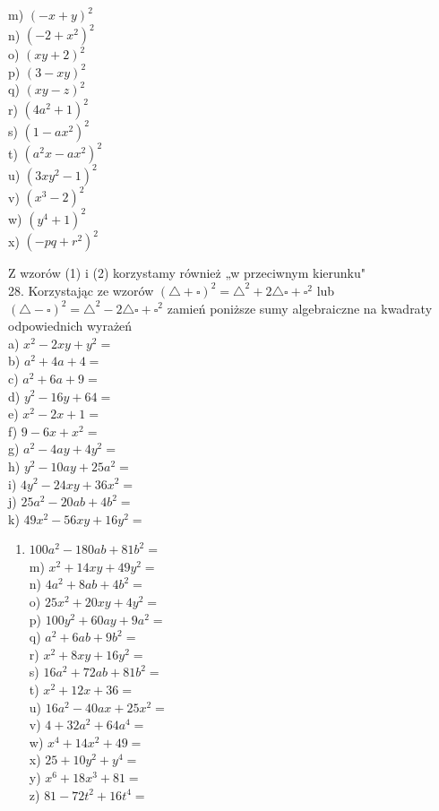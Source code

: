 \documentclass[10pt]{article}
\begin{document}
\begin{enumerate}
m) \((-x+y)^{2}\)\\
n) \(\left(-2+x^{2}\right)^{2}\)\\
o) \((x y+2)^{2}\)\\
p) \((3-x y)^{2}\)\\
q) \((x y-z)^{2}\)\\
r) \(\left(4 a^{2}+1\right)^{2}\)\\
s) \(\left(1-a x^{2}\right)^{2}\)\\
t) \(\left(a^{2} x-a x^{2}\right)^{2}\)\\
u) \(\left(3 x y^{2}-1\right)^{2}\)\\
v) \(\left(x^{3}-2\right)^{2}\)\\
w) \(\left(y^{4}+1\right)^{2}\)\\
x) \(\left(-p q+r^{2}\right)^{2}\)
\end{enumerate}

Z wzorów (1) i (2) korzystamy również „w przeciwnym kierunku"\\
28. Korzystając ze wzorów \((\triangle+\square)^{2}=\triangle^{2}+2 \triangle \square+\square^{2}\) lub \((\triangle-\square)^{2}=\triangle^{2}-2 \triangle \square+\square^{2}\) zamień poniższe sumy algebraiczne na kwadraty odpowiednich wyrażeń\\
a) \(x^{2}-2 x y+y^{2}=\)\\
b) \(a^{2}+4 a+4=\)\\
c) \(a^{2}+6 a+9=\)\\
d) \(y^{2}-16 y+64=\)\\
e) \(x^{2}-2 x+1=\)\\
f) \(9-6 x+x^{2}=\)\\
g) \(a^{2}-4 a y+4 y^{2}=\)\\
h) \(y^{2}-10 a y+25 a^{2}=\)\\
i) \(4 y^{2}-24 x y+36 x^{2}=\)\\
j) \(25 a^{2}-20 a b+4 b^{2}=\)\\
k) \(49 x^{2}-56 x y+16 y^{2}=\)

\begin{enumerate}
  \item \(100 a^{2}-180 a b+81 b^{2}=\)\\
m) \(x^{2}+14 x y+49 y^{2}=\)\\
n) \(4 a^{2}+8 a b+4 b^{2}=\)\\
o) \(25 x^{2}+20 x y+4 y^{2}=\)\\
p) \(100 y^{2}+60 a y+9 a^{2}=\)\\
q) \(a^{2}+6 a b+9 b^{2}=\)\\
r) \(x^{2}+8 x y+16 y^{2}=\)\\
s) \(16 a^{2}+72 a b+81 b^{2}=\)\\
t) \(x^{2}+12 x+36=\)\\
u) \(16 a^{2}-40 a x+25 x^{2}=\)\\
v) \(4+32 a^{2}+64 a^{4}=\)\\
w) \(x^{4}+14 x^{2}+49=\)\\
x) \(25+10 y^{2}+y^{4}=\)\\
y) \(x^{6}+18 x^{3}+81=\)\\
z) \(81-72 t^{2}+16 t^{4}=\)
\end{enumerate}
\end{document}
